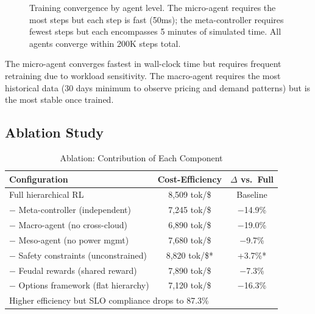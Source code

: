\documentclass[conference,10pt]{IEEEtran}
\begin{document}
\begin{figure}[!t]
\centering
{}
\caption{Training convergence by agent level. The micro-agent requires the most steps but each step is fast (50ms); the meta-controller requires fewest steps but each encompasses 5 minutes of simulated time. All agents converge within 200K steps total.}
\label{fig:convergence}
\end{figure}


The micro-agent converges fastest in wall-clock time but requires frequent retraining due to workload sensitivity. The macro-agent requires the most historical data (30 days minimum to observe pricing and demand patterns) but is the most stable once trained.

\subsection{Ablation Study}

\begin{table}[!htbp]
\caption{Ablation: Contribution of Each Component}
\label{tab:ablation}
\centering\scriptsize
\begin{tabular}{@{}lcc@{}}
\toprule
\textbf{Configuration} & \textbf{Cost-Efficiency} & \textbf{$\Delta$ vs.\ Full} \\
\midrule
Full hierarchical RL & 8,509 tok/\$ & Baseline \\
$-$ Meta-controller (independent) & 7,245 tok/\$ & $-$14.9\% \\
$-$ Macro-agent (no cross-cloud) & 6,890 tok/\$ & $-$19.0\% \\
$-$ Meso-agent (no power mgmt) & 7,680 tok/\$ & $-$9.7\% \\
$-$ Safety constraints (unconstrained) & 8,820 tok/\$* & +3.7\%* \\
$-$ Feudal rewards (shared reward) & 7,890 tok/\$ & $-$7.3\% \\
$-$ Options framework (flat hierarchy) & 7,120 tok/\$ & $-$16.3\% \\
\bottomrule
\multicolumn{3}{l}{\scriptsize *Higher efficiency but SLO compliance drops to 87.3\%}
\end{tabular}
\end{table}
\end{document}
